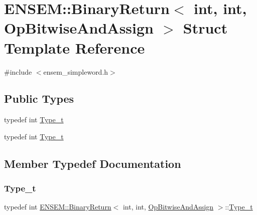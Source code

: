 \hypertarget{structENSEM_1_1BinaryReturn_3_01int_00_01int_00_01OpBitwiseAndAssign_01_4}{}\section{E\+N\+S\+EM\+:\+:Binary\+Return$<$ int, int, Op\+Bitwise\+And\+Assign $>$ Struct Template Reference}
\label{structENSEM_1_1BinaryReturn_3_01int_00_01int_00_01OpBitwiseAndAssign_01_4}


{\ttfamily \#include $<$ensem\+\_\+simpleword.\+h$>$}

\subsection*{Public Types}
\begin{DoxyCompactItemize}
\item 
typedef int \mbox{\hyperlink{structENSEM_1_1BinaryReturn_3_01int_00_01int_00_01OpBitwiseAndAssign_01_4_a0dd17e33f27d41964bcaa781f8d58aca}{Type\+\_\+t}}
\item 
typedef int \mbox{\hyperlink{structENSEM_1_1BinaryReturn_3_01int_00_01int_00_01OpBitwiseAndAssign_01_4_a0dd17e33f27d41964bcaa781f8d58aca}{Type\+\_\+t}}
\end{DoxyCompactItemize}


\subsection{Member Typedef Documentation}
\mbox{\label{structENSEM_1_1BinaryReturn_3_01int_00_01int_00_01OpBitwiseAndAssign_01_4_a0dd17e33f27d41964bcaa781f8d58aca}} 
\subsubsection{\texorpdfstring{Type\_t}{Type\_t}\hspace{0.1cm}{\footnotesize\ttfamily [1/2]}}
{\footnotesize\ttfamily typedef int \mbox{\hyperlink{structENSEM_1_1BinaryReturn}{E\+N\+S\+E\+M\+::\+Binary\+Return}}$<$ int, int, \mbox{\hyperlink{structENSEM_1_1OpBitwiseAndAssign}{Op\+Bitwise\+And\+Assign}} $>$\+::\mbox{\hyperlink{structENSEM_1_1BinaryReturn_3_01int_00_01int_00_01OpBitwiseAndAssign_01_4_a0dd17e33f27d41964bcaa781f8d58aca}{Type\+\_\+t}}}

